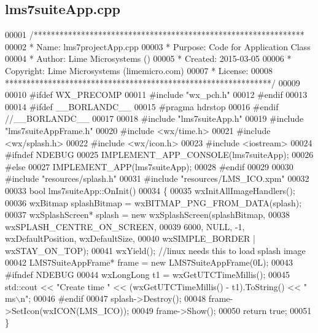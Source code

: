 \subsection{lms7suite\+App.\+cpp}
\label{lms7suiteApp_8cpp_source}

\begin{DoxyCode}
00001 \textcolor{comment}{/***************************************************************}
00002 \textcolor{comment}{ * Name:      lms7projectApp.cpp}
00003 \textcolor{comment}{ * Purpose:   Code for Application Class}
00004 \textcolor{comment}{ * Author:    Lime Microsystems ()}
00005 \textcolor{comment}{ * Created:   2015-03-05}
00006 \textcolor{comment}{ * Copyright: Lime Microsystems (limemicro.com)}
00007 \textcolor{comment}{ * License:}
00008 \textcolor{comment}{ **************************************************************/}
00009 
00010 \textcolor{preprocessor}{#ifdef WX\_PRECOMP}
00011 \textcolor{preprocessor}{#include "wx\_pch.h"}
00012 \textcolor{preprocessor}{#endif}
00013 
00014 \textcolor{preprocessor}{#ifdef \_\_BORLANDC\_\_}
00015 \textcolor{preprocessor}{#pragma hdrstop}
00016 \textcolor{preprocessor}{#endif //\_\_BORLANDC\_\_}
00017 
00018 \textcolor{preprocessor}{#include "lms7suiteApp.h"}
00019 \textcolor{preprocessor}{#include "lms7suiteAppFrame.h"}
00020 \textcolor{preprocessor}{#include <wx/time.h>}
00021 \textcolor{preprocessor}{#include <wx/splash.h>}
00022 \textcolor{preprocessor}{#include <wx/icon.h>}
00023 \textcolor{preprocessor}{#include <iostream>}
00024 \textcolor{preprocessor}{#ifndef NDEBUG}
00025 IMPLEMENT_APP_CONSOLE(lms7suiteApp);
00026 \textcolor{preprocessor}{#else}
00027 IMPLEMENT\_APP(lms7suiteApp);
00028 \textcolor{preprocessor}{#endif}
00029 
00030 \textcolor{preprocessor}{#include "resources/splash.h"}
00031 \textcolor{preprocessor}{#include "resources/LMS\_ICO.xpm"}
00032 
00033 \textcolor{keywordtype}{bool} lms7suiteApp::OnInit()
00034 \{
00035     wxInitAllImageHandlers();
00036     wxBitmap splashBitmap = wxBITMAP\_PNG\_FROM\_DATA(splash);
00037     wxSplashScreen* splash = \textcolor{keyword}{new} wxSplashScreen(splashBitmap,
00038         wxSPLASH\_CENTRE\_ON\_SCREEN,
00039         6000, NULL, -1, wxDefaultPosition, wxDefaultSize,
00040         wxSIMPLE\_BORDER | wxSTAY\_ON\_TOP);
00041     wxYield(); \textcolor{comment}{//linux needs this to load splash image}
00042     LMS7SuiteAppFrame* frame = \textcolor{keyword}{new} LMS7SuiteAppFrame(0L);
00043 \textcolor{preprocessor}{#ifndef NDEBUG}
00044     wxLongLong t1 = wxGetUTCTimeMillis(); 
00045     std::cout << \textcolor{stringliteral}{"Create time "} << (wxGetUTCTimeMillis() - t1).ToString() << \textcolor{stringliteral}{" ms\(\backslash\)n"};
00046 \textcolor{preprocessor}{#endif}
00047     splash->Destroy();
00048     frame->SetIcon(wxICON(LMS\_ICO));
00049     frame->Show();
00050     \textcolor{keywordflow}{return} \textcolor{keyword}{true};
00051 \}
\end{DoxyCode}

